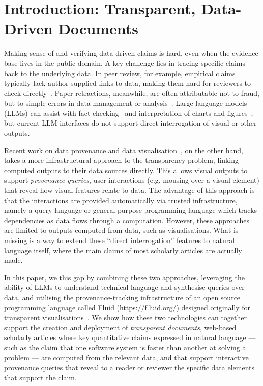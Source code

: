 \section{Introduction: Transparent, Data-Driven Documents}

Making sense of and verifying data-driven claims is hard, even when the evidence base lives in the public
domain. A key challenge lies in tracing specific claims back to the underlying data. In peer review, for
example, empirical claims typically lack author-supplied links to data, making them hard for reviewers to
check directly~\citep{weber20}. Paper retractions, meanwhile, are often attributable not to fraud, but to
simple errors in data management or analysis~\citep{hu25}. Large language models (LLMs) can assist with
fact-checking~\citep{abu-ahmad25} and interpretation of charts and figures~\citep{roberts24}, but current LLM
interfaces do not support direct interrogation of visual or other outputs.

Recent work on data provenance and data visualisation~\citep{psallidas18smoke,bond25}, on the other hand,
takes a more infrastructural approach to the transparency problem, linking computed outputs to their data
sources directly. This allows visual outputs to support \emph{provenance queries}, user interactions (e.g.
mousing over a visual element) that reveal how visual features relate to data. The advantage of this approach
is that the interactions are provided automatically via trusted infrastructure, namely a query language or
general-purpose programming language which tracks dependencies as data flows through a computation. However,
these approaches are limited to outputs computed from data, such as visualisations. What is missing is a way
to extend these ``direct interrogation'' features to natural language itself, where the main claims of most
scholarly articles are actually made.

In this paper, we this gap by combining these two approaches, leveraging the ability of LLMs to understand
technical language and synthesise queries over data, and utilising the provenance-tracking infrastructure of
an open source programming language called Fluid (\url{https://f.luid.org/}) designed originally for
transparent visualisations~\citep{perera22,bond25}. We show how these two technologies can together support
the creation and deployment of \emph{transparent documents}, web-based scholarly articles where key
quantitative claims expressed in natural language --- such as the claim that one software system is faster
than another at solving a problem --- are computed from the relevant data, and that support interactive
provenance queries that reveal to a reader or reviewer the specific data elements that support the claim.

